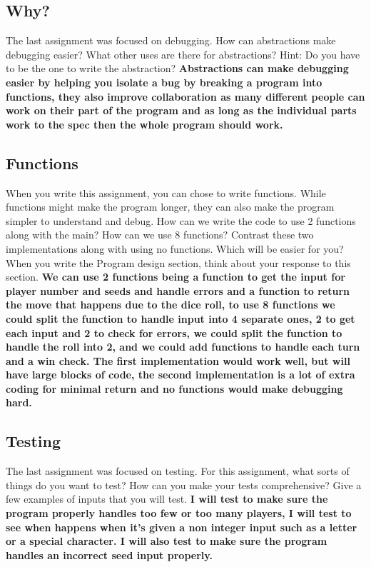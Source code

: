 \documentclass{article}
\begin{document}
\subsection{Why?}

The last assignment was focused on debugging. How can abstractions make debugging easier?
What other uses are there for abstractions? Hint: Do you have to be the one to write the abstraction?\textbf{
Abstractions can make debugging easier by helping you isolate a bug by breaking a program into functions, they also improve collaboration as many different people can work on their part of the program and as long as the individual parts work to the spec then the whole program should work.
}
\subsection{Functions}

When you write this assignment, you can chose to write functions. While functions might make the program longer, they can also make the program simpler to understand and debug. 
How can we write the code to use 2 functions along with the main? How can we use 8 functions? Contrast these two implementations along with using no functions. Which will be easier for you?
When you write the Program design section, think about your response to this section.\textbf{ 
We can use 2 functions being a function to get the input for player number and seeds and handle errors and a function to return the move that happens due to the dice roll, to use 8 functions we could split the function to handle input into 4 separate ones, 2 to get each input and 2 to check for errors, we could split the function to handle the roll into 2, and we could add functions to handle each turn and a win check. The first implementation would work well, but will have large blocks of code, the second implementation is a lot of extra coding for minimal return and no functions would make debugging hard.
}
\subsection{Testing}

The last assignment was focused on testing. For this assignment, what sorts of things do you want to test? How can you make your tests comprehensive?
Give a few examples of inputs that you will test.\textbf{
I will test to make sure the program properly handles too few or too many players, I will test to see when happens when it's given a non integer input such as a letter or a special character. I will also test to make sure the program handles an incorrect seed input properly.
}
\end{document}
